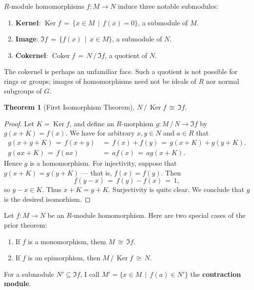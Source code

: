 \documentclass[11pt]{article}
\newtheorem{theorem}{Theorem}
\newcommand{\Ker}{\operatorname{Ker}}
\newcommand{\Coker}{\operatorname{Coker}}
\begin{document}
$R$-module homomorphisms $f : M \to N$ induce three notable submodules: 
\begin{enumerate}
  \item \textbf{Kernel}: $\Ker f \, = \, \{ x \in M \, \mid \, f(x) = 0 \}$, a submodule of $M$.
  \item \textbf{Image}: $\Im f \, = \, \{ f(x) \, \mid \, x \in M \}$, a submodule of $N$.
  \item \textbf{Cokernel}: $\Coker f \, = \, N \, / \, \Im f$, a quotient of $N$.
\end{enumerate}
The cokernel is perhaps an unfamiliar face. Such a quotient is not possible for rings or groups; images of homomorphisms need not be ideals of $R$ nor normal subgroups of $G$. 

\begin{adjustwidth}{0.5cm}{}
  \begin{theorem}[First Isomorphism Theorem]
     $N \, / \, \Ker f \, \cong \, \Im f$.
  \end{theorem}
  \begin{proof}
    Let $K = \Ker f$, and define an $R$-morphism $g : M \, / \, N \to \Im f$ by $g(x + K) = f(x)$. We have for arbitrary $x, y \in N$ and $a \in R$ that
    \begin{align*}
      g(x + y + K) \, = \, f(x + y) \, &= \, f(x) + f(y) \, = \, g(x + K) + g(y + K). \\
            g(ax + K) \, = \, f(ax) \, &= \, a f(x) \, = \, a g(x + K).
    \end{align*}
    Hence $g$ is a homomorphism. For injectivity, suppose that $g(x + K) = g(y + K)$ --- that is, $f(x) = f(y)$. Then
    \[
      f(y - x) \, = \, f(y) - f(x) \, = \, 1,
    \]
    so $y - x \in K$. Thus $x + K = y + K$. Surjectivity is quite clear. We conclude that $g$ is the desired isomorhism.
  \end{proof}
\end{adjustwidth}

Let $f : M \to N$ be an $R$-module homomorphism. Here are two special cases of the prior theorem:
\begin{enumerate}
  \item If $f$ is a monomorphism, them $M \, \cong \, \Im f$.
  \item If $f$ is an epimorphism, then $M \, / \, \Ker f \, \cong \, N$.
\end{enumerate}

For a submodule $N' \subseteq \Im f$, I call $M' = \{ x \in M \, \mid \, f(a) \in N' \}$ the \textbf{contraction module}.
\end{document}
